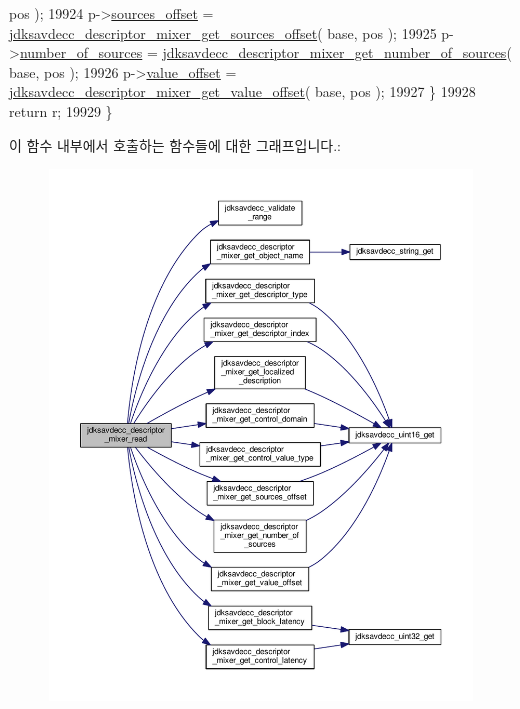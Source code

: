 \begin{DoxyCode}
       pos );
19924         p->\hyperlink{structjdksavdecc__descriptor__mixer_ac9ce4e1b642e6654d49504898dbe738d}{sources\_offset} = 
      \hyperlink{group__descriptor__mixer_gaf1cabb8917bea8683fddb27083581053}{jdksavdecc\_descriptor\_mixer\_get\_sources\_offset}( base, pos );
19925         p->\hyperlink{structjdksavdecc__descriptor__mixer_a1af3a7f3729937d5da218737ba5b2483}{number\_of\_sources} = 
      \hyperlink{group__descriptor__mixer_ga56f98377aec36a7ab390a818dce6518d}{jdksavdecc\_descriptor\_mixer\_get\_number\_of\_sources}( base, 
      pos );
19926         p->\hyperlink{structjdksavdecc__descriptor__mixer_a67b64485005415f9a58a25736aa8def1}{value\_offset} = 
      \hyperlink{group__descriptor__mixer_gaa5c0ba55c141e621e25459ae9e779145}{jdksavdecc\_descriptor\_mixer\_get\_value\_offset}( base, pos );
19927     \}
19928     \textcolor{keywordflow}{return} r;
19929 \}
\end{DoxyCode}


이 함수 내부에서 호출하는 함수들에 대한 그래프입니다.\+:
\nopagebreak
\begin{figure}[H]
\begin{center}
\leavevmode
\includegraphics[width=350pt]{group__descriptor__mixer_gab728785314eb0d92b830dc27a1bc35d4_cgraph}
\end{center}
\end{figure}


